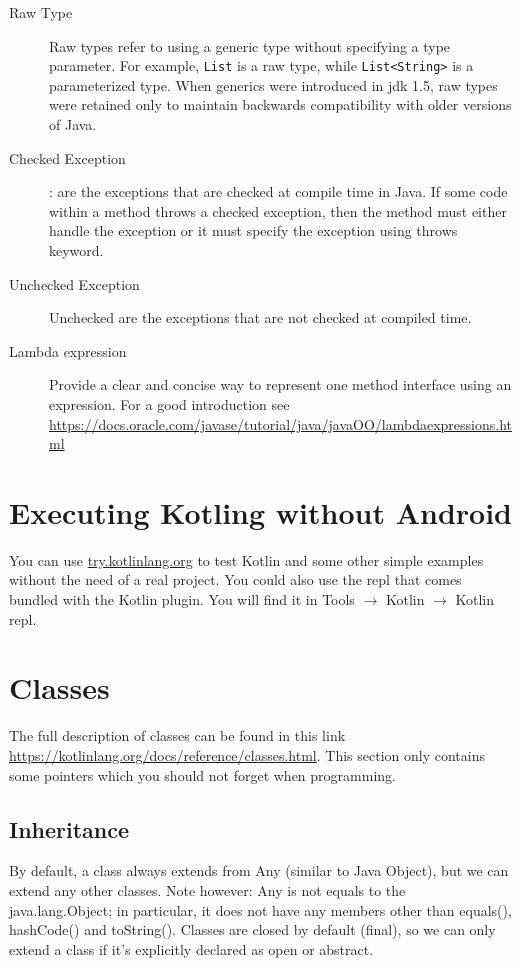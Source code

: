 \begin{description}
	\item[Raw Type] Raw types refer to using a generic type without specifying a type parameter.
		For example, \texttt{List} is a raw type, while \texttt{List<String>} is a parameterized type.
		When generics were introduced in \gls{jdk} 1.5, raw types were retained only to maintain backwards compatibility with older versions of Java.
	\item[Checked Exception]: are the exceptions that are checked at compile time in Java.
		If some code within a method throws a checked exception, then the method must either handle the exception or it must specify the exception using throws keyword.
	\item[Unchecked Exception] Unchecked are the exceptions that are not checked at compiled time.
	\item[Lambda expression] Provide a clear and concise way to represent one method interface using an expression.
For a good introduction see \url{https://docs.oracle.com/javase/tutorial/java/javaOO/lambdaexpressions.html}
\end{description}

\section{Executing Kotling without Android}

You can use \url{try.kotlinlang.org} to test Kotlin and some other simple examples without the need of a real project.
You could also use the \gls{repl} that comes bundled with the Kotlin plugin.
You will find it in Tools $\rightarrow$ Kotlin $\rightarrow$ Kotlin \gls{repl}.

\section{Classes}
The full description of classes can be found in this link \url{https://kotlinlang.org/docs/reference/classes.html}.
This section only contains some pointers which you should not forget when programming.

\subsection{Inheritance}
By default, a class always extends from Any (similar to Java Object), but we can extend any other classes.
Note however: Any is not  equals to the java.lang.Object; in particular, it does not have any members other than equals(), hashCode() and toString().
Classes are closed by default (final), so we can only extend a class if it’s explicitly declared as open or abstract.

